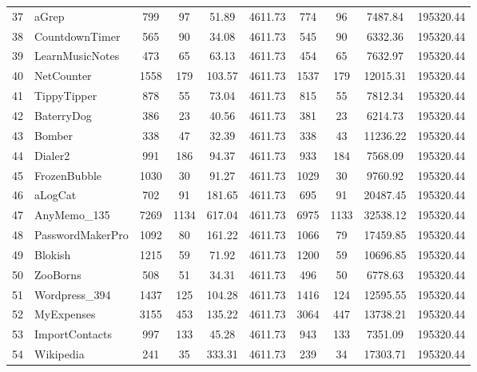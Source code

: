 \begin{landscape}
\begin{table}[]
{\begin{tabular}{llcccccccc}
				37&aGrep&799&97&51.89&4611.73&774&96&7487.84&195320.44\\
				38&CountdownTimer&565&90&34.08&4611.73&545&90&6332.36&195320.44\\
				39&LearnMusicNotes&473&65&63.13&4611.73&454&65&7632.97&195320.44\\
				40&NetCounter&1558&179&103.57&4611.73&1537&179&12015.31&195320.44\\
				41&TippyTipper&878&55&73.04&4611.73&815&55&7812.34&195320.44\\
				42&BaterryDog&386&23&40.56&4611.73&381&23&6214.73&195320.44\\
				43&Bomber&338&47&32.39&4611.73&338&43&11236.22&195320.44\\
				44&Dialer2&991&186&94.37&4611.73&933&184&7568.09&195320.44\\
				45&FrozenBubble&1030&30&91.27&4611.73&1029&30&9760.92&195320.44\\
				46&aLogCat&702&91&181.65&4611.73&695&91&20487.45&195320.44\\
				47&AnyMemo\_135&7269&1134&617.04&4611.73&6975&1133&32538.12&195320.44\\
				48&PasswordMakerPro&1092&80&161.22&4611.73&1066&79&17459.85&195320.44\\
				49&Blokish&1215&59&71.92&4611.73&1200&59&10696.85&195320.44\\
				50&ZooBorns&508&51&34.31&4611.73&496&50&6778.63&195320.44\\
				51&Wordpress\_394&1437&125&104.28&4611.73&1416&124&12595.55&195320.44\\
				52&MyExpenses&3155&453&135.22&4611.73&3064&447&13738.21&195320.44\\
				53&ImportContacts&997&133&45.28&4611.73&943&133&7351.09&195320.44\\
				54&Wikipedia&241&35&333.31&4611.73&239&34&17303.71&195320.44\\
		\end{tabular}}
	\end{table}
\end{landscape}


